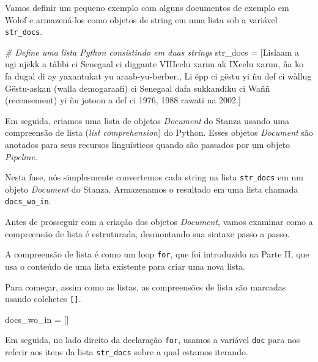 \documentclass[
  brazilian,
]{article}
\newenvironment{Shaded}{}{}
\newcommand{\CommentTok}[1]{\textcolor[rgb]{0.38,0.63,0.69}{\textit{#1}}}
\newcommand{\NormalTok}[1]{#1}
\newcommand{\OperatorTok}[1]{\textcolor[rgb]{0.40,0.40,0.40}{#1}}
\newcommand{\StringTok}[1]{\textcolor[rgb]{0.25,0.44,0.63}{#1}}
\begin{document}
Vamos definir um pequeno exemplo com alguns documentos de exemplo em
Wolof e armazená-los como objetos de string em uma lista sob a variável
\texttt{str\_docs}.

\begin{Shaded}
\begin{Highlighting}[]
\CommentTok{\# Define uma lista Python consistindo em duas strings}
\NormalTok{str\_docs }\OperatorTok{=}\NormalTok{ [}\StringTok{\textquotesingle{}Lislaam a ngi njëkk a tàbbi ci Senegaal ci diggante VIIIeelu xarnu ak IXeelu xarnu, ña ko fa dugal di ay yaxantukat yu araab{-}yu{-}berber.\textquotesingle{}}\NormalTok{,}
            \StringTok{\textquotesingle{}Li ëpp ci gëstu yi ñu def ci wàllug Gëstu{-}askan (walla demogaraafi) ci Senegaal dafa sukkandiku ci Waññ (recensement) yi ñu jotoon a def ci 1976, 1988 rawati na 2002.\textquotesingle{}}\NormalTok{]}
\end{Highlighting}
\end{Shaded}

Em seguida, criamos uma lista de objetos \emph{Document} do Stanza
usando uma compreensão de lista (\emph{list comprehension}) do Python.
Esses objetos \emph{Document} são anotados para seus recursos
linguísticos quando são passados por um objeto \emph{Pipeline}.

Nesta fase, nós simplesmente convertemos cada string na lista
\texttt{str\_docs} em um objeto \emph{Document} do Stanza. Armazenamos o
resultado em uma lista chamada \texttt{docs\_wo\_in}.

Antes de prosseguir com a criação dos objetos \emph{Document}, vamos
examinar como a compreensão de lista é estruturada, desmontando sua
sintaxe passo a passo.

A compreensão de lista é como um loop \texttt{for}, que foi introduzido
na Parte II, que usa o conteúdo de uma lista existente para criar uma
nova lista.

Para começar, assim como as listas, as compreensões de lista são
marcadas usando colchetes \texttt{{[}{]}}.

\begin{Shaded}
\begin{Highlighting}[]
\NormalTok{docs\_wo\_in }\OperatorTok{=}\NormalTok{ []}
\end{Highlighting}
\end{Shaded}

Em seguida, no lado direito da declaração \texttt{for}, usamos a
variável \texttt{doc} para nos referir aos itens da lista
\texttt{str\_docs} sobre a qual estamos iterando.
\end{document}

